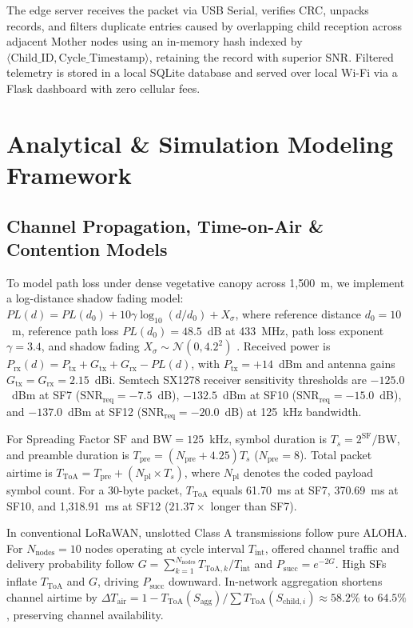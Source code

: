\documentclass[conference]{IEEEtran}
\begin{document}
The edge server receives the packet via USB Serial, verifies CRC, unpacks records, and filters duplicate entries caused by overlapping child reception across adjacent Mother nodes using an in-memory hash indexed by $\langle \text{Child\_ID}, \text{Cycle\_Timestamp} \rangle$, retaining the record with superior SNR. Filtered telemetry is stored in a local SQLite database and served over local Wi-Fi via a Flask dashboard with zero cellular fees.

\section{Analytical \& Simulation Modeling Framework}
\label{sec:analytical_models}

\subsection{Channel Propagation, Time-on-Air \& Contention Models}
To model path loss under dense vegetative canopy across 1,500~m, we implement a log-distance shadow fading model: $PL(d) = PL(d_0) + 10 \gamma \log_{10}(d / d_0) + X_\sigma$, where reference distance $d_0 = 10$~m, reference path loss $PL(d_0) = 48.5$~dB at 433~MHz, path loss exponent $\gamma = 3.4$, and shadow fading $X_\sigma \sim \mathcal{N}(0, 4.2^2)$ \cite{saravanos2022path}. Received power is $P_{\text{rx}}(d) = P_{\text{tx}} + G_{\text{tx}} + G_{\text{rx}} - PL(d)$, with $P_{\text{tx}} = +14$~dBm and antenna gains $G_{\text{tx}} = G_{\text{rx}} = 2.15$~dBi. Semtech SX1278 receiver sensitivity thresholds are $-125.0$~dBm at SF7 ($\text{SNR}_{\text{req}} = -7.5$~dB), $-132.5$~dBm at SF10 ($\text{SNR}_{\text{req}} = -15.0$~dB), and $-137.0$~dBm at SF12 ($\text{SNR}_{\text{req}} = -20.0$~dB) at 125~kHz bandwidth.

For Spreading Factor $\text{SF}$ and $\text{BW} = 125$~kHz, symbol duration is $T_s = 2^{\text{SF}}/\text{BW}$, and preamble duration is $T_{\text{pre}} = (N_{\text{pre}} + 4.25) T_s$ ($N_{\text{pre}} = 8$). Total packet airtime is $T_{\text{ToA}} = T_{\text{pre}} + (N_{\text{pl}} \times T_s)$, where $N_{\text{pl}}$ denotes the coded payload symbol count. For a 30-byte packet, $T_{\text{ToA}}$ equals 61.70~ms at SF7, 370.69~ms at SF10, and 1,318.91~ms at SF12 ($21.37\times$ longer than SF7).

In conventional LoRaWAN, unslotted Class A transmissions follow pure ALOHA. For $N_{\text{nodes}} = 10$ nodes operating at cycle interval $T_{\text{int}}$, offered channel traffic and delivery probability follow $G = \sum_{k=1}^{N_{\text{nodes}}} T_{\text{ToA}, k} / T_{\text{int}}$ and $P_{\text{succ}} = e^{-2G}$. High SFs inflate $T_{\text{ToA}}$ and $G$, driving $P_{\text{succ}}$ downward. In-network aggregation shortens channel airtime by $\Delta T_{\text{air}} = 1 - T_{\text{ToA}}(S_{\text{agg}}) / \sum T_{\text{ToA}}(S_{\text{child}, i}) \approx 58.2\%$ to $64.5\%$, preserving channel availability.
\end{document}

